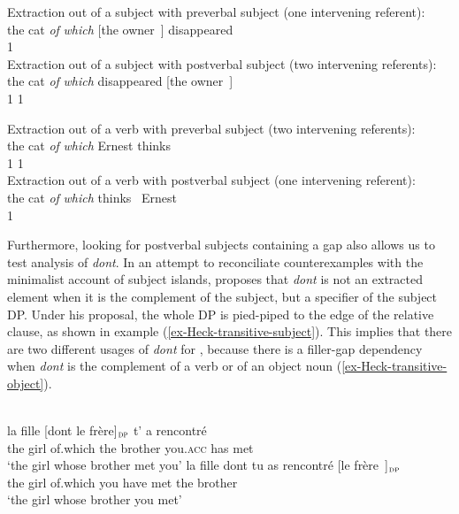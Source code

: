 \eal\label{ex:ldt-subject}
\ex Extraction out of a subject with preverbal subject (one intervening referent):\\
\gll the cat \textit{of} \textit{which} [the owner~\trace{}] disappeared \\
{} {} {} {} {} 1 {} \\
\ex Extraction out of a subject with postverbal subject (two intervening referents):\\
\gll the cat \textit{of} \textit{which} disappeared [the owner~\trace{}]  \\
{} {} {} {} 1 {} 1\\
\zl 

\eal\label{ex:ldt-verb}
\ex Extraction out of a verb with preverbal subject (two intervening referents):\\
\gll the cat \textit{of} \textit{which} Ernest thinks~\trace{} \\
{} {} {} {} 1 1  \\
\ex Extraction out of a verb with postverbal subject (one intervening referent):\\
\gll the cat \textit{of} \textit{which} thinks~\trace{} Ernest \\
{} {} {} {} 1 \\
\zl 


Furthermore, looking for postverbal subjects containing a gap also allows us to test  analysis of \emph{dont}. In an attempt to reconciliate  counterexamples with the minimalist account of subject islands, \citeauthor{Heck.2009} proposes that \emph{dont} is not an extracted element when it is the complement of the subject, but a specifier of the subject DP. Under his proposal, the whole DP is pied-piped to the edge of the relative clause, as shown in example (\ref{ex-Heck-transitive-subject}). This implies that there are two different usages of \emph{dont} for \citet{Heck.2009}, because there is a filler-gap dependency when \emph{dont} is the complement of a verb or of an object noun (\ref{ex-Heck-transitive-object}).

\eal
\ex \citep[101]{Heck.2009}\\
\gll la fille [dont le frère]$_{\textsc{dp}}$ t' a rencontré\\
the girl of.which the brother you.\textsc{acc} has met \\
\glt `the girl whose brother met you'
\label{ex-Heck-transitive-subject}
\ex \gll la fille dont tu as rencontré [le frère~\trace{}]$_{\textsc{dp}}$\\
the girl of.which you have met the brother\\
\glt `the girl whose brother you met'
\label{ex-Heck-transitive-object}
\zl 

